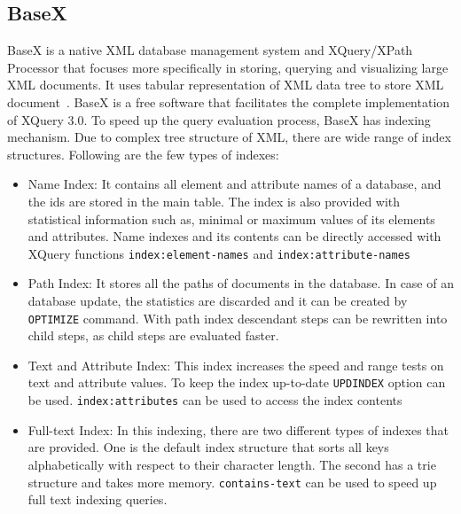 	\subsection{BaseX}
	BaseX is a native XML database management system and XQuery/XPath Processor that focuses more specifically in storing, querying and visualizing large XML documents. It uses tabular representation of XML data tree to store XML document~\citep{www/basex}. BaseX is a free software that facilitates the complete implementation of XQuery 3.0. To speed up the query evaluation process, BaseX has indexing mechanism. Due to complex tree structure of XML, there are wide range of index structures. Following are the few types of indexes:
	\begin{itemize}
	\item {Name Index:} It contains all element and attribute names of a database, and the ids are stored in the main table. The index is also provided with statistical information such as, minimal or maximum values of its elements and attributes. Name indexes and its contents can be directly accessed with XQuery functions \texttt{index:element-names} and \texttt{index:attribute-names}
	
	 \item{Path Index:} It stores all the paths of documents in the database. In case of an database update, the statistics are discarded and it can be created by \texttt{OPTIMIZE} command. With path index descendant steps can be rewritten into child steps, as child steps are evaluated faster.
	 
	 \item{Text and Attribute Index:} This index increases the speed and range tests on text and attribute values. To keep the index up-to-date \texttt{UPDINDEX} option can be used. \texttt{index:attributes} can be used to access the index contents
	  	 \item{Full-text Index:} In this indexing, there are two different types of indexes that are provided. One is the default index structure that sorts all keys alphabetically with respect to their character length. The second has a trie structure and takes more memory. \texttt{contains-text} can be used to speed up full text indexing queries.


\end{itemize}

